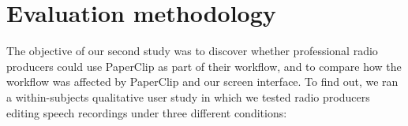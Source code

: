 






\section{Evaluation methodology}\label{sec:paper-method}

The objective of our second study was to discover whether professional radio producers could use PaperClip as part of
their workflow, and to compare how the workflow was affected by PaperClip and our screen interface.  To find out, we
ran a within-subjects qualitative user study in which we tested radio producers editing speech recordings under three
different conditions:

